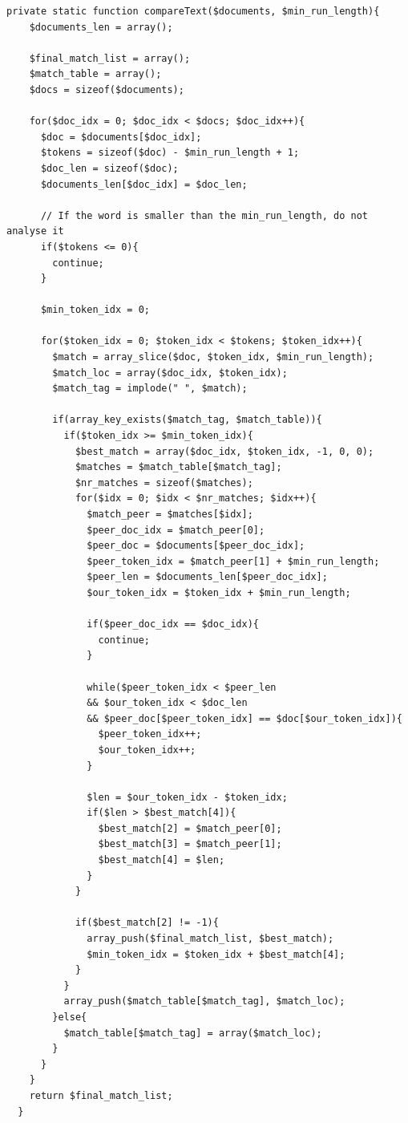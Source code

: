 \begin{lstlisting}
private static function compareText($documents, $min_run_length){
    $documents_len = array();

    $final_match_list = array();
    $match_table = array();
    $docs = sizeof($documents);

    for($doc_idx = 0; $doc_idx < $docs; $doc_idx++){
      $doc = $documents[$doc_idx];
      $tokens = sizeof($doc) - $min_run_length + 1;
      $doc_len = sizeof($doc);
      $documents_len[$doc_idx] = $doc_len;

      // If the word is smaller than the min_run_length, do not analyse it
      if($tokens <= 0){
        continue;
      }

      $min_token_idx = 0;

      for($token_idx = 0; $token_idx < $tokens; $token_idx++){
        $match = array_slice($doc, $token_idx, $min_run_length);
        $match_loc = array($doc_idx, $token_idx);
        $match_tag = implode(" ", $match);

        if(array_key_exists($match_tag, $match_table)){
          if($token_idx >= $min_token_idx){
            $best_match = array($doc_idx, $token_idx, -1, 0, 0);
            $matches = $match_table[$match_tag];
            $nr_matches = sizeof($matches);
            for($idx = 0; $idx < $nr_matches; $idx++){
              $match_peer = $matches[$idx];
              $peer_doc_idx = $match_peer[0];
              $peer_doc = $documents[$peer_doc_idx];
              $peer_token_idx = $match_peer[1] + $min_run_length;
              $peer_len = $documents_len[$peer_doc_idx];
              $our_token_idx = $token_idx + $min_run_length;

              if($peer_doc_idx == $doc_idx){
                continue;
              }

              while($peer_token_idx < $peer_len
              && $our_token_idx < $doc_len
              && $peer_doc[$peer_token_idx] == $doc[$our_token_idx]){
                $peer_token_idx++;
                $our_token_idx++;
              }

              $len = $our_token_idx - $token_idx;
              if($len > $best_match[4]){
                $best_match[2] = $match_peer[0];
                $best_match[3] = $match_peer[1];
                $best_match[4] = $len;
              }
            }

            if($best_match[2] != -1){
              array_push($final_match_list, $best_match);
              $min_token_idx = $token_idx + $best_match[4];
            }
          }
          array_push($match_table[$match_tag], $match_loc);
        }else{
          $match_table[$match_tag] = array($match_loc);
        }
      }
    }
    return $final_match_list;
  }
\end{lstlisting}